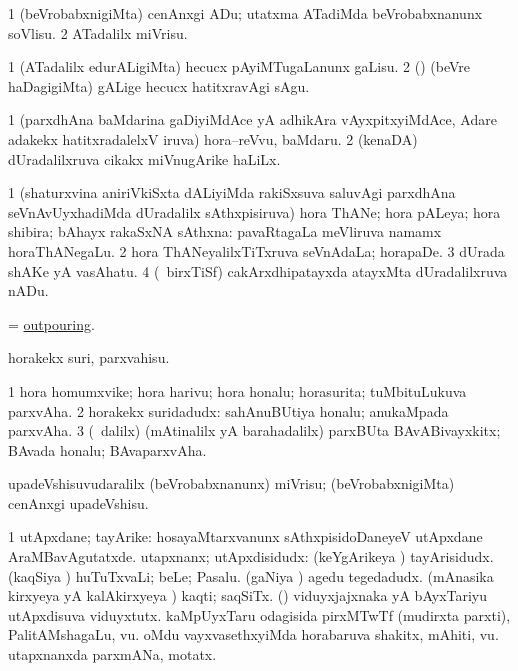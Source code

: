 \bentry
{}
\gl{\sakirx}
\bmng
\bnum
\num{1} (beVrobabxnigiMta) cenAnxgi ADu; utatxma ATadiMda beVrobabxnanunx soVlisu. 
\num{2} ATadalilx miVrisu. 
\enum
\emng
\eentry

\bentry
{}
\gl{\sakirx}
\bmng
\bnum
\num{1} (ATadalilx edurALigiMta) hecucx pAyiMTugaLanunx gaLisu. 
\num{2} (\nw) (beVre haDagigiMta) gALige hecucx hatitxravAgi sAgu. 
\enum
\emng
\eentry

\bentry
{}
\gl{\nA}
\bmng
\bnum
\num{1} (parxdhAna baMdarina gaDiyiMdAce yA adhikAra vAyxpitxyiMdAce, Adare adakekx hatitxradalelxV iruva) hora--reVvu, baMdaru. 
\num{2} (kenaDA) dUradalilxruva cikakx miVnugArike haLiLx. 
\enum
\emng
\eentry

\bentry
{}
\gl{\nA}
\bmng
\bnum
\num{1} (shaturxvina aniriVkiSxta dALiyiMda rakiSxsuva saluvAgi parxdhAna seVnAvUyxhadiMda dUradalilx sAthxpisiruva) hora ThANe; hora pALeya; hora shibira; bAhayx rakaSxNA sAthxna:  pavaRtagaLa meVliruva namamx horaThANegaLu. 
\num{2} hora ThANeyalilxTiTxruva seVnAdaLa; horapaDe. 
\num{3} dUrada shAKe yA vasAhatu. 
\num{4} (\kanmu\ birxTiSf) cakArxdhipatayxda atayxMta dUradalilxruva nADu. 
\enum
\emng
\eentry

\bentry
{}
\gl{\nA}
\bmng
= \hyperlink{outpouring}{outpouring}. 
\emng
\eentry

\bentry
{}
\gl{\sakirx}
\bmng
horakekx suri, parxvahisu. 
\emng
\eentry

\bentry
{}
\gl{\nA}
\bmng
\bnum
\num{1} hora homumxvike; hora harivu; hora honalu; horasurita; tuMbituLukuva parxvAha. 
\num{2} horakekx suridadudx:  sahAnuBUtiya honalu; anukaMpada parxvAha. 
\num{3} (\sA\ \bava dalilx) (mAtinalilx yA barahadalilx) parxBUta BAvABivayxkitx; BAvada honalu; BAvaparxvAha. 
\enum
\emng
\eentry

\bentry
{}
\gl{\sakirx}
\bmng
upadeVshisuvudaralilx (beVrobabxnanunx) miVrisu; (beVrobabxnigiMta) cenAnxgi upadeVshisu. 
\emng
\eentry

\bentry
{}
\gl{\nA}
\bmng
\bnum
\num{1} utApxdane; tayArike:  hosayaMtarxvanunx sAthxpisidoDaneyeV utApxdane AraMBavAgutatxde. 
 utapxnanx; utApxdisidudx: 
\banum
{} (keYgArikeya \vi) tayArisidudx. 
 (kaqSiya \vi) huTuTxvaLi; beLe; Pasalu. 
 (gaNiya \vi) agedu tegedadudx. 
 (mAnasika kirxyeya yA kalAkirxyeya \vi) kaqti; saqSiTx. 
 (\viduyx) viduyxjajxnaka yA bAyxTariyu utApxdisuva viduyxtutx. 
 kaMpUyxTaru odagisida pirxMTwTf (mudirxta parxti), PalitAMshagaLu, \mo vu. 
 oMdu vayxvasethxyiMda horabaruva shakitx, mAhiti, \mo vu. 
 utapxnanxda parxmANa, motatx. 
\eanum
\numie
\enum
\emng
\eentry

